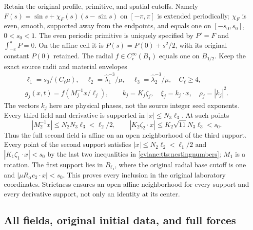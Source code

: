 Retain the original profile, primitive, and spatial cutoffs. Namely
$F(s)=\sin s+\chi_F(s)(s-\sin s)$ on $[-\pi,\pi]$ is
extended periodically; $\chi_F$ is even, smooth, supported away
from the endpoints, and equals one on $[-s_0,s_0]$, $0<s_0<1$.
The even periodic primitive is uniquely specified by $P'=F$ and
$\int_{-\pi}^{\pi}P=0$. On the affine cell it is
$P(s)=P(0)+s^2/2$, with its original constant $P(0)$ retained.
The radial $f\in C_c^\infty(B_1)$ equals one on $B_{1/2}$.
Keep the exact source radii and material envelopes
\begin{equation}\label{cvlane:tts:envelopes}
 \begin{gathered}
 \ell_1=s_0/(C_\ell\mu),\quad
 \ell_2=\widehat\lambda_1^{-3}/\mu,\quad
 \ell_3=\widehat\lambda_2^{-3}/\mu,\quad C_\ell\geq4,\\
 g_j(x,t)=f(M_j^{-1}x/\ell_j),\qquad
 k_j=K_j\zeta_j,\quad \xi_j=k_j\cdot x,
 \quad\rho_j=|k_j|^2.
 \end{gathered}
\end{equation}
The vectors $k_j$ here are physical phases, not the source integer
seed exponents. Every third field and derivative is supported in
$|x|\leq N_3\ell_3$. At such points
\[
 |M_2^{-1}x|\leq N_2N_3\ell_3<\ell_2/2,\qquad
 |K_2\zeta_2\cdot x|\leq K_2\sqrt{11}N_3\ell_3<s_0.
\]
Thus the full second field is affine on an open neighborhood of
the third support. Every point of the second support satisfies
$|x|\leq N_2\ell_2<\ell_1/2$ and
$|K_1\zeta_1\cdot x|<s_0$ by the last two inequalities in
\eqref{cvlane:tts:nestingnumbers}; $M_1$ is a rotation. The first
support lies in $B_{\ell_1}$, where the original radial base
cutoff is one and $|\mu R_\alpha e_2\cdot x|<s_0$.
This proves every inclusion in the original laboratory coordinates.
Strictness ensures an open affine neighborhood for every support
and every derivative support, not only an identity at its center.

\subsection{All fields, original initial data, and full forces}

